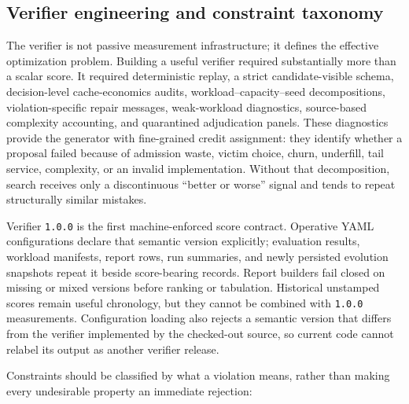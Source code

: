 \documentclass[11pt]{article}
\newcommand{\identifier}[1]{\nolinkurl{#1}}
\begin{document}
\subsection{Verifier engineering and constraint taxonomy}

The verifier is not passive measurement infrastructure; it defines the effective
optimization problem.  Building a useful verifier required substantially more than a
scalar score.  It required deterministic replay, a strict candidate-visible schema,
decision-level cache-economics audits, workload--capacity--seed decompositions,
violation-specific repair messages, weak-workload diagnostics, source-based
complexity accounting, and quarantined adjudication panels.  These diagnostics provide
the generator with fine-grained credit assignment: they identify whether a proposal
failed because of admission waste, victim choice, churn, underfill, tail service,
complexity, or an invalid implementation.  Without that decomposition, search receives
only a discontinuous ``better or worse'' signal and tends to repeat structurally
similar mistakes.

Verifier \identifier{1.0.0} is the first machine-enforced score contract.  Operative
YAML configurations declare that semantic version explicitly; evaluation results,
workload manifests, report rows, run summaries, and newly persisted evolution
snapshots repeat it beside score-bearing records.  Report builders fail closed on
missing or mixed versions before ranking or tabulation.  Historical unstamped scores
remain useful chronology, but they cannot be combined with \identifier{1.0.0}
measurements.  Configuration loading also rejects a semantic version that differs
from the verifier implemented by the checked-out source, so current code cannot
relabel its output as another verifier release.

Constraints should be classified by what a violation means, rather than making every
undesirable property an immediate rejection:
\end{document}
